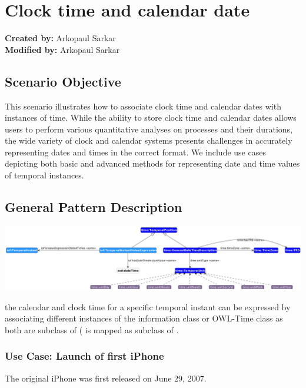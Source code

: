 \section{Clock time and calendar date}
\label{sec-clock-calendar}

\textbf{Created by:} Arkopaul Sarkar \\
\textbf{Modified by:} Arkopaul Sarkar \\

\subsection*{Scenario Objective}

This scenario illustrates how to associate clock time and calendar dates with instances of time. While the ability to store clock time and calendar dates allows users to perform various quantitative analyses on processes and their durations, the wide variety of clock and calendar systems presents challenges in accurately representing dates and times in the correct format. We include use cases depicting both basic and advanced methods for representing date and time values of temporal instances.


\subsection*{General Pattern Description}

\includegraphics[scale=0.28]{scenarios/clock-time-calendar-date/images/general-clock-calendar.png}

the calendar and clock time for a specific temporal instant can be expressed by associating different instances of the information class  or OWL-Time class  as both are subclass of  ( is mapped as subclass of .  

\subsubsection*{Use Case: Launch of first iPhone} 
The original iPhone was first released on June 29, 2007. 

